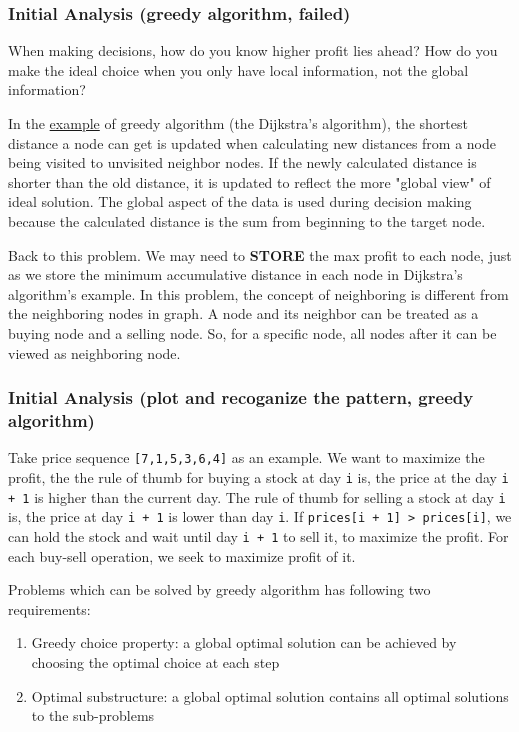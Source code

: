 \documentclass[12pt]{article}
\begin{document}
\subsubsection{Initial Analysis (greedy algorithm, failed)}
\label{sec:orgccb7173}
When making decisions, how do you know higher profit lies ahead? How do you make the ideal choice when you only have local information, not the global information?

In the \href{https://brilliant.org/wiki/greedy-algorithm/}{example} of greedy algorithm (the Dijkstra's algorithm), the shortest distance a node can get is updated when calculating new distances from a node being visited to unvisited neighbor nodes. If the newly calculated distance is shorter than the old distance, it is updated to reflect the more "global view" of ideal solution. The global aspect of the data is used during decision making because the calculated distance is the sum from beginning to the target node.

Back to this problem. We may need to \textbf{STORE} the max profit to each node, just as we store the minimum accumulative distance in each node in Dijkstra's algorithm's example. In this problem, the concept of neighboring is different from the neighboring nodes in graph. A node and its neighbor can be treated as a buying node and a selling node. So, for a specific node, all nodes after it can be viewed as neighboring node.
\subsubsection{Initial Analysis (plot and recoganize the pattern, greedy algorithm)}
\label{sec:orge3674f2}
Take price sequence \texttt{[7,1,5,3,6,4]} as an example. We want to maximize the profit, the the rule of thumb for buying a stock at day \texttt{i} is, the price at the day \texttt{i + 1} is higher than the current day. The rule of thumb for selling a stock at day \texttt{i} is, the price at day \texttt{i + 1} is lower than day \texttt{i}. If \texttt{prices[i + 1] > prices[i]}, we can hold the stock and wait until day \texttt{i + 1} to sell it, to maximize the profit. For each buy-sell operation, we seek to maximize profit of it.

Problems which can be solved by greedy algorithm has following two requirements:
\begin{enumerate}
\item Greedy choice property: a global optimal solution can be achieved by choosing the optimal choice at each step
\item Optimal substructure: a global optimal solution contains all optimal solutions to the sub-problems
\end{enumerate}
\end{document}
